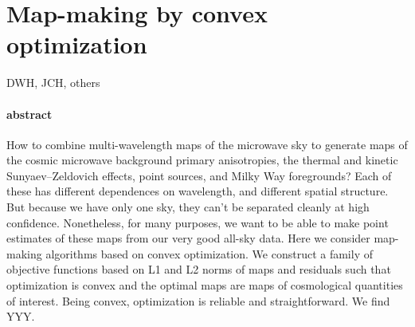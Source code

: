 \documentclass[11pt]{article}
\begin{document}
\section*{Map-making by convex optimization}

\noindent
DWH, JCH, others

\paragraph{abstract}
How to combine multi-wavelength maps of the microwave sky to generate
maps of the cosmic microwave background primary anisotropies, the
thermal and kinetic Sunyaev--Zeldovich effects, point sources, and
Milky Way foregrounds?
Each of these has different dependences on wavelength, and different
spatial structure.
But because we have only one sky, they can't be separated cleanly at
high confidence.
Nonetheless, for many purposes, we want to be able to make point
estimates of these maps from our very good all-sky data.
Here we consider map-making algorithms based on convex optimization.
We construct a family of objective functions based on L1 and L2 norms
of maps and residuals such that optimization is convex and the optimal
maps are maps of cosmological quantities of interest.
Being convex, optimization is reliable and straightforward.
We find YYY.
\end{document}
